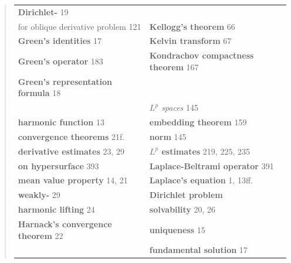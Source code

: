 \begin{quote}
\begin{tabular}{@{}p{}p{}@{}}
\quad \textbf{Dirichlet-} \hfill 19 &
\\
\quad for oblique derivative problem \hfill 121 &
\textbf{Kellogg's theorem} \hfill 66 \\
\textbf{Green's identities} \hfill 17 &
\textbf{Kelvin transform} \hfill 67 \\
\textbf{Green's operator} \hfill 183 &
\textbf{Kondrachov compactness theorem} \hfill 167 \\
\textbf{Green's representation formula} \hfill 18 &
\\
&
\emph{$L^p$ spaces} \hfill 145 \\
\textbf{harmonic function} \hfill 13 &
\quad \textbf{embedding theorem} \hfill 159 \\
\quad \textbf{convergence theorems} \hfill 21f. &
\quad \textbf{norm} \hfill 145 \\
\quad \textbf{derivative estimates} \hfill 23, 29 &
\quad \textbf{$L^p$ estimates} \hfill 219, 225, 235 \\
\quad \textbf{on hypersurface} \hfill 393 &
\textbf{Laplace-Beltrami operator} \hfill 391 \\
\quad \textbf{mean value property} \hfill 14, 21 &
\textbf{Laplace's equation} \hfill 1, 13ff. \\
\quad \textbf{weakly-} \hfill 29 &
\quad \textbf{Dirichlet problem} \\
\quad \textbf{harmonic lifting} \hfill 24 &
\quad \quad \textbf{solvability} \hfill 20, 26 \\
\textbf{Harnack's convergence theorem} \hfill 22 &
\quad \quad \textbf{uniqueness} \hfill 15 \\
&
\quad \textbf{fundamental solution} \hfill 17
\end{tabular}
\end{quote}

